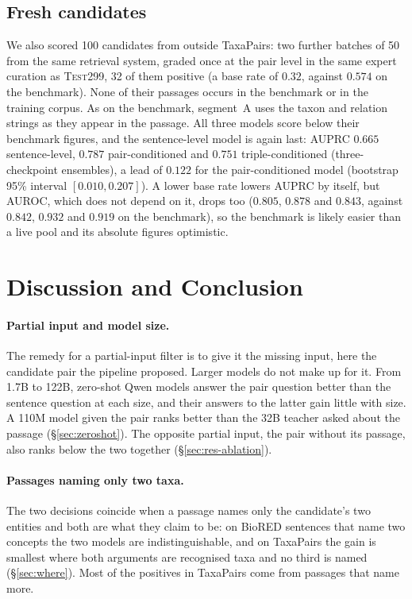 \documentclass[11pt]{article}
\newcommand{\bench}{\mbox{TaxaPairs}}
\begin{document}
\subsection{Fresh candidates}
\label{sec:fresh}

We also scored 100 candidates from outside \bench{}: two further batches of 50 from the same
retrieval system, graded once at the pair level in the same expert curation as \textsc{Test299},
32 of them positive (a base rate of $0.32$, against $0.574$ on the benchmark). None of their
passages occurs in the benchmark or in the training corpus. As on the benchmark, segment~A uses the
taxon and relation strings as they appear in the passage. All three models score below their
benchmark figures, and the sentence-level model is again last: AUPRC $0.665$ sentence-level,
$0.787$ pair-conditioned and $0.751$ triple-conditioned (three-checkpoint ensembles), a lead of
$0.122$ for the pair-conditioned model (bootstrap 95\% interval $[0.010, 0.207]$). A lower base rate
lowers AUPRC by itself, but AUROC, which does not depend on it, drops too ($0.805$, $0.878$ and $0.843$,
against $0.842$, $0.932$ and $0.919$ on the benchmark), so the benchmark is likely easier than a live
pool and its absolute figures optimistic.

\section{Discussion and Conclusion}
\label{sec:discussion}
\label{sec:conclusion}

\paragraph{Partial input and model size.}
The remedy for a partial-input filter is to give it the missing input, here the candidate pair the pipeline proposed. Larger models do not make up for it. From 1.7B to 122B, zero-shot Qwen models answer the pair
question better than the sentence question at each size, and their answers to the latter gain
little with size. A 110M model given the pair ranks better than the 32B teacher asked about
the passage (\S\ref{sec:zeroshot}). The opposite partial input, the pair without its passage, also ranks below the
two together (\S\ref{sec:res-ablation}).

\paragraph{Passages naming only two taxa.}
The two decisions coincide when a passage names only the candidate's two entities and both are
what they claim to be: on BioRED sentences that name two concepts the two models are
indistinguishable, and on \bench{} the gain is smallest where both arguments are recognised
taxa and no third is named (\S\ref{sec:where}). Most of the positives in \bench{} come from passages that name
more.
\end{document}
